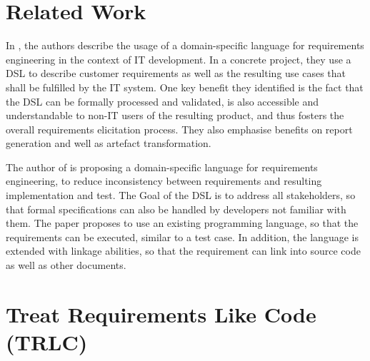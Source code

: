 \documentclass[english]{lni}
\begin{document}
\section{Related Work}


In \cite{Leuser2015}, the authors describe the usage of a
domain-specific language for requirements engineering in the context
of IT development. In a concrete project, they use a DSL to describe
customer requirements as well as the resulting use cases that shall be
fulfilled by the IT system. One key benefit they identified is the
fact that the DSL can be formally processed and validated, is also
accessible and understandable to non-IT users of the resulting
product, and thus fosters the overall requirements elicitation
process. They also emphasise benefits on report generation and well as
artefact transformation.

The author of \cite{Galinier2018} is proposing a domain-specific
language for requirements engineering, to reduce inconsistency between
requirements and resulting implementation and test. The Goal of the
DSL is to address all stakeholders, so that formal specifications can
also be handled by developers not familiar with them. The paper
proposes to use an existing programming language, so that the
requirements can be executed, similar to a test case. In addition, the
language is extended with linkage abilities, so that the requirement
can link into source code as well as other documents.

\section{Treat Requirements Like Code (TRLC)}
\label{trlc}
\end{document}
